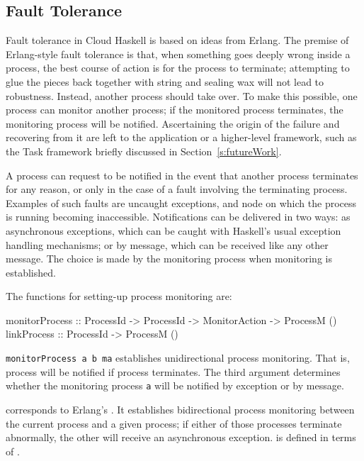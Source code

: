 \documentclass[preprint]{sigplanconf}
\begin{document}
\subsection{Fault Tolerance}
\label{FaultTolerance}
Fault tolerance in Cloud Haskell is based on ideas from Erlang. 
%
The premise of Erlang-style fault tolerance is that, when something goes deeply wrong inside a process, the best course of action is for the process to terminate; attempting to glue the pieces back together with string and sealing wax will not lead to robustness.   Instead, another process should take over.  
To make this possible, one process can monitor another process; if the monitored process terminates, the monitoring process will be notified. 
Ascertaining the origin of the failure and recovering from it are left to the application or a higher-level framework, such as the Task framework briefly discussed in Section~\ref{s:futureWork}.

A process can request to be notified in the event that another process terminates for any reason, or only in the case of a fault involving the terminating process.
Examples of such faults are uncaught exceptions, and node on which the process is running becoming inaccessible. 
Notifications can be delivered in two ways: as asynchronous exceptions, which can be caught with Haskell's usual exception handling mechanisms; or by message, which can be received like any other message.
The choice is made by the monitoring process when monitoring is established.

The functions for setting-up process monitoring are:

\begin{code}
monitorProcess :: ProcessId -> ProcessId
               		-> MonitorAction -> ProcessM ()
linkProcess    :: ProcessId -> ProcessM ()
\end{code}

\noindent
\lstinline!monitorProcess a b ma! establishes unidirectional process monitoring. That is, process  will be notified if process  terminates. The third argument determines whether the monitoring process \texttt{a} will be notified by exception or by message.

 corresponds to Erlang's . It establishes bidirectional process monitoring between the current process and a given process; if either of those processes terminate abnormally, the other will receive an asynchronous exception.  is defined in terms of . 
\end{document}
